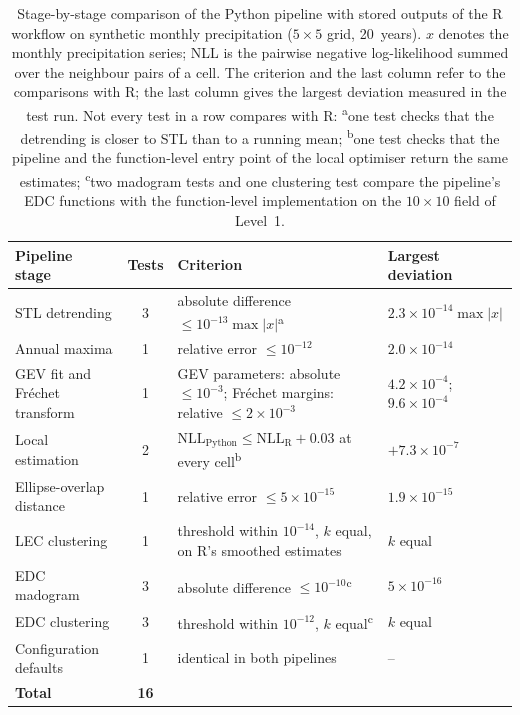 \documentclass[preprint,12pt,a4paper]{elsarticle}
\begin{document}
{\begin{table}[!htbp]
\centering
\small
\setlength{\tabcolsep}{4pt}
\begin{tabularx}{\textwidth}{>{\raggedright\arraybackslash}p{3.3cm}c>{\raggedright\arraybackslash}X>{\raggedright\arraybackslash}p{3.0cm}}
\toprule
\textbf{Pipeline stage} & \textbf{Tests} &
  \textbf{Criterion} & \textbf{Largest deviation} \\
\midrule
STL detrending & 3 &
  absolute difference $\leq 10^{-13}\max|x|$\textsuperscript{a} & \mbox{$2.3{\times}10^{-14}\max|x|$} \\
Annual maxima & 1 &
  relative error $\leq 10^{-12}$ & $2.0\times10^{-14}$ \\
GEV fit and Fr\'{e}chet transform & 1 &
  GEV parameters: absolute $\leq 10^{-3}$; Fr\'{e}chet margins:
  relative $\leq 2\times10^{-3}$ & $4.2\times10^{-4}$;
  $9.6\times10^{-4}$ \\
Local estimation & 2 &
  $\mathrm{NLL}_{\text{Python}} \leq \mathrm{NLL}_{\text{R}} + 0.03$
  at every cell\textsuperscript{b} & $+7.3\times10^{-7}$ \\
Ellipse-overlap distance & 1 &
  relative error $\leq 5\times10^{-15}$ & $1.9\times10^{-15}$ \\
LEC clustering & 1 &
  threshold within $10^{-14}$, $k$ equal, on R's smoothed estimates
  & $k$ equal \\
EDC madogram & 3 &
  absolute difference $\leq 10^{-10}$\textsuperscript{c} & $5\times10^{-16}$ \\
EDC clustering & 3 &
  threshold within $10^{-12}$, $k$ equal\textsuperscript{c} & $k$ equal \\
Configuration defaults & 1 &
  identical in both pipelines & -- \\
\midrule
\textbf{Total} & \textbf{16} & & \\
\bottomrule
\end{tabularx}
\caption{Stage-by-stage comparison of the Python pipeline with stored
  outputs of the R workflow on synthetic monthly precipitation
  ($5{\times}5$ grid, 20~years). $x$ denotes the monthly precipitation
  series; NLL is the pairwise negative log-likelihood summed over the
  neighbour pairs of a cell. The criterion and the last column refer
  to the comparisons with R; the last column gives the largest
  deviation measured in the test run. Not every test in a row
  compares with R:
  \textsuperscript{a}one test checks that the detrending is closer to
  STL than to a running mean;
  \textsuperscript{b}one test checks that the pipeline and the
  function-level entry point of the local optimiser return the same
  estimates;
  \textsuperscript{c}two madogram tests and one clustering test
  compare the pipeline's EDC functions with the function-level
  implementation on the $10{\times}10$ field of Level~1.}
\label{tab:pipeline-parity}
\end{table}}
\end{document}
